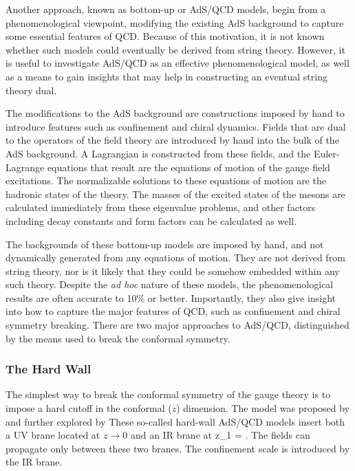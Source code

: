 Another approach, known as bottom-up or AdS/QCD models, begin from a phenomenological viewpoint, modifying the existing AdS background to capture some essential features of QCD.
Because of this motivation, it is not known whether such models could eventually be derived from string theory.
However, it is useful to investigate AdS/QCD as an effective phenomenological model, as well as a means to gain insights that may help in constructing an eventual string theory dual.
 
The modifications to the AdS background are constructions imposed by hand to introduce features such as confinement and chiral dynamics.
Fields that are dual to the operators of the field theory are introduced by hand into the bulk of the AdS background.
A Lagrangian is constructed from these fields, and the Euler-Lagrange equations that result are the equations of motion of the gauge field excitations.
The normalizable solutions to these equations of motion are the hadronic states of the theory.
The masses of the excited states of the mesons are calculated immediately from these eigenvalue problems, and other factors including decay constants and form factors can be calculated as well.

The backgrounds of these bottom-up models are imposed by hand, and not dynamically generated from any equations of motion.
They are not derived from string theory, nor is it likely that they could be somehow embedded within any such theory.
Despite the \emph{ad hoc} nature of these models, the phenomenological results are often accurate to 10\% or better.
Importantly, they also give insight into how to capture the major features of QCD, such as confinement and chiral symmetry breaking.
There are two major approaches to AdS/QCD, distinguished by the means used to break the conformal symmetry.

\subsubsection{The Hard Wall}
The simplest way to break the conformal symmetry of the gauge theory is to impose a hard cutoff in the conformal ($z$) dimension.
The model was proposed by \cite{stephanov-katz-son} and further explored by \cite{DaRold:2005zs,DaRold:2005vr}
These so-called hard-wall AdS/QCD models insert both a UV brane located at $z\rightarrow 0$ and an IR brane at 
\be
z_1 = .
\ee
The fields can propagate only between these two branes.
The confinement scale is introduced by the IR brane.


